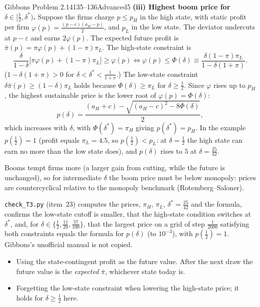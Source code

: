 \begin{exsol}{Gibbons Problem 2.14}{135--136}{Advanced}{5}
\textbf{(iii) Highest boom price for $\delta \in [\frac12, \delta^*)$.} Suppose the firms charge $p \le p_H$ in the high
state, with static profit per firm $\varphi(p) = \frac{(p - c)(a_H - p)}{2}$, and $p_L$ in the low state. The deviator
undercuts at $p - \varepsilon$ and earns $2\varphi(p)$. The expected future profit is $\bar\pi(p) = \pi\varphi(p) +
(1-\pi)\pi_L$. The high-state constraint is
\[
  \frac{\delta}{1-\delta}\bigl[\pi\varphi(p) + (1-\pi)\pi_L\bigr] \ge \varphi(p)
  \iff \varphi(p) \le \Phi(\delta) \equiv \frac{\delta(1-\pi)\pi_L}{1 - \delta(1+\pi)} .
\]
($1 - \delta(1+\pi) > 0$ for $\delta < \delta^* < \frac1{1+\pi}$.) The low-state constraint $\delta\bar\pi(p) \ge
(1-\delta)\pi_L$ holds because $\Phi(\delta) \ge \pi_L$ for $\delta \ge \frac12$. Since $\varphi$ rises up to $p_H$, the highest sustainable
price is the lower root of $\varphi(p) = \Phi(\delta)$:
\[
  p(\delta) = \frac{(a_H + c) - \sqrt{(a_H - c)^2 - 8\Phi(\delta)}}{2},
\]
which increases with $\delta$, with $\Phi(\delta^*) = \pi_H$ giving $p(\delta^*) = p_H$. In the example $p(\frac12) = 1$
(profit equals $\pi_L = 4.5$, so $p(\frac12) < p_L$: at $\delta = \frac12$ the high state can earn no more than the low
state does), and $p(\delta)$ rises to $5$ at $\delta = \frac{25}{42}$.

\interp Booms tempt firms more (a larger gain from cutting, while the future is unchanged), so for intermediate $\delta$ the
boom price must be below monopoly: prices are countercyclical relative to the monopoly benchmark (Rotemberg--Saloner).

\verify \texttt{check\_T3.py} (item~23) computes the prices, $\pi_H$, $\pi_L$, $\delta^* = \frac{25}{42}$ and the
formula, confirms the low-state cutoff is smaller, that the high-state condition switches at $\delta^*$, and, for
$\delta \in \{\frac12, \frac{11}{20}, \frac{57}{100}\}$, that the largest price on a grid of step $\frac1{2000}$
satisfying both constraints equals the formula for $p(\delta)$ (to $10^{-3}$), with $p(\frac12) = 1$. Gibbons's
unofficial manual is not copied.

\mistakes
\begin{itemize}
  \item Using the state-contingent profit as the future value. After the next draw the future value is the
  \emph{expected} $\bar\pi$, whichever state today is.
  \item Forgetting the low-state constraint when lowering the high-state price; it holds for $\delta \ge \frac12$ here.
\end{itemize}

\answer{(i) $p_i = \frac{a_i + c}{2}$. (ii) $\delta^* = \dfrac{(a_H - c)^2}{(a_H - c)^2(1+\pi) + (1-\pi)(a_L - c)^2}$. (iii) For
$\delta \in [\frac12, \delta^*)$: $p(\delta) = \frac12\bigl[(a_H + c) - \sqrt{(a_H - c)^2 - 8\Phi(\delta)}\bigr]$ with
$\Phi(\delta) = \frac{\delta(1-\pi)(a_L - c)^2/8}{1 - \delta(1+\pi)}$, rising from the price that earns the low-state
profit at $\delta = \frac12$ to $p_H$ at $\delta^*$.}
\end{exsol}
